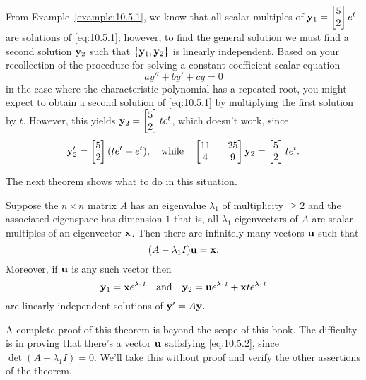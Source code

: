 \documentclass{ximera}
\begin{document}
From Example~\ref{example:10.5.1}, we know that all scalar multiples of
${\bf y}_1=\begin{bmatrix}5\\2\end{bmatrix}e^t$ are solutions of \eqref{eq:10.5.1};
however,
to find the general solution we must find a second solution ${\bf
y}_2$ such that $\{{\bf y}_1,{\bf y}_2\}$ is linearly independent.
Based on your recollection of the procedure for solving a constant
coefficient scalar equation
$$
ay''+by'+cy=0
$$
in the case where the characteristic polynomial has a repeated root,
you might expect to obtain a second solution of \eqref{eq:10.5.1} by
multiplying the first solution by $t$. However, this yields ${\bf
y}_2=\begin{bmatrix}5\\2\end{bmatrix}te^t$, which doesn't work, since
$$
{\bf y}_2'=\begin{bmatrix}5\\2\end{bmatrix}(te^t+e^t),\quad\mbox{while}\quad
\begin{bmatrix}11&-25\\4&-9\end{bmatrix}{\bf y}_2=\begin{bmatrix}5\\2\end{bmatrix}te^t.
$$

The next theorem shows what to do in this situation.

\begin{theorem}\label{thmtype:10.5.1}
Suppose the $n\times n$ matrix $A$ has an eigenvalue $\lambda_1$
of multiplicity $\geq 2$ and the associated eigenspace has dimension
$1$ that is, all $\lambda_1$-eigenvectors of $A$ are scalar
multiples
of  an eigenvector ${\bf x}$.  Then there are infinitely many vectors
${\bf u}$ such that
\begin{equation}\label{eq:10.5.2}
(A-\lambda_1I){\bf u}={\bf x}.
\end{equation}
Moreover, if ${\bf u}$ is any such vector  then
\begin{equation}\label{eq:10.5.3}
{\bf y}_1={\bf x}e^{\lambda_1t}\quad\mbox{and}\quad
{\bf y}_2={\bf u}e^{\lambda_1t}+{\bf x}te^{\lambda_1t}
\end{equation}
are linearly independent  solutions of ${\bf y}'=A{\bf y}.$
\end{theorem}

A complete proof of this theorem is beyond the scope of this book. The
difficulty is in proving that there's a vector ${\bf u}$ satisfying
\eqref{eq:10.5.2}, since $\det(A-\lambda_1I)=0$. We'll take this without
proof and verify the other assertions of the theorem.
\end{document}
